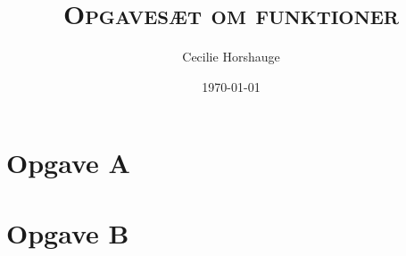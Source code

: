 \documentclass[a4paper, 11pt]{article}
\title{{\large \textsc{Opgavesæt om funktioner}}}
\author{Cecilie Horshauge}
\date{\today}
\begin{document}
\maketitle
\noindent 

\section*{Opgave A} 


\section*{Opgave B} 
\end{document}
